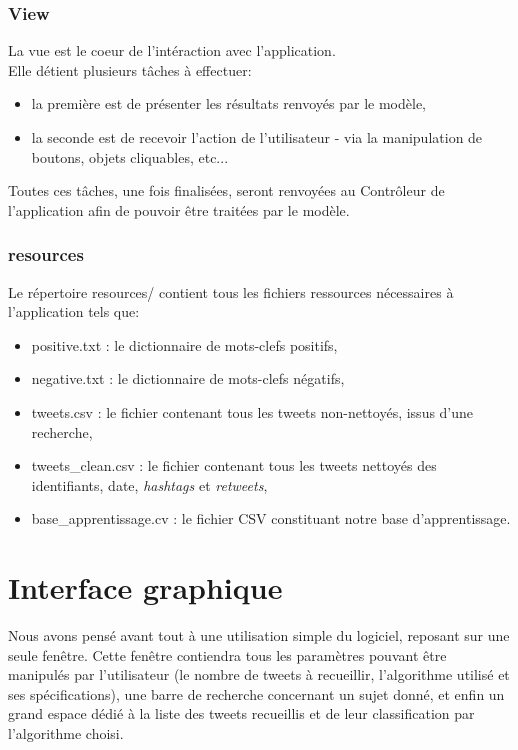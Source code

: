 \documentclass[pdftex,12pt,a4paper]{report}
\begin{document}
\begin{spacing}{1.2}
\subsubsection{View}

La vue est le coeur de l'intéraction avec l'application.
\\
Elle détient plusieurs tâches à effectuer:
\begin{itemize}
\item{la première est de présenter les résultats renvoyés par le modèle,}
\item{la seconde est de recevoir l'action de l'utilisateur - via la manipulation de boutons, objets cliquables, etc...}
\end{itemize}
Toutes ces tâches, une fois finalisées, seront renvoyées au Contrôleur de l'application afin de pouvoir être traitées par le modèle.

\subsubsection{resources}

Le répertoire resources/ contient tous les fichiers ressources nécessaires à l'application tels que:
\begin{itemize}
\item{positive.txt : le dictionnaire de mots-clefs positifs,}
\item{negative.txt : le dictionnaire de mots-clefs négatifs,}
\item{tweets.csv : le fichier contenant tous les tweets non-nettoyés, issus d'une recherche,}
\item{tweets\_clean.csv : le fichier contenant tous les tweets nettoyés des identifiants, date, \textit{hashtags} et \textit{retweets},}
\item{base\_apprentissage.cv : le fichier CSV constituant notre base d'apprentissage.}
\end{itemize}

\section{Interface graphique}

Nous avons pensé avant tout à une utilisation simple du logiciel, reposant sur une seule fenêtre. Cette fenêtre contiendra tous les paramètres pouvant être manipulés par l'utilisateur (le nombre de tweets à recueillir, l'algorithme utilisé et ses spécifications), une barre de recherche concernant un sujet donné, et enfin un grand espace dédié à la liste des tweets recueillis et de leur classification par l'algorithme choisi.


\end{spacing}
\end{document}
